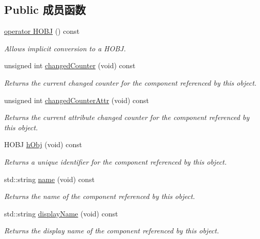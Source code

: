 \subsection*{Public 成员函数}
\begin{DoxyCompactItemize}
\item 
\hypertarget{classmv_i_m_p_a_c_t_1_1acquire_1_1_component_access_ac32f2e24d0edecf7da8368324bdc493f}{\hyperlink{classmv_i_m_p_a_c_t_1_1acquire_1_1_component_access_ac32f2e24d0edecf7da8368324bdc493f}{operator H\+O\+B\+J} () const }\label{classmv_i_m_p_a_c_t_1_1acquire_1_1_component_access_ac32f2e24d0edecf7da8368324bdc493f}

\begin{DoxyCompactList}\small\item\em Allows implicit conversion to a H\+O\+B\+J. \end{DoxyCompactList}\item 
unsigned int \hyperlink{classmv_i_m_p_a_c_t_1_1acquire_1_1_component_access_a9f1ce26fe668a03990316e35882ef82d}{changed\+Counter} (void) const 
\begin{DoxyCompactList}\small\item\em Returns the current changed counter for the component referenced by this object. \end{DoxyCompactList}\item 
unsigned int \hyperlink{classmv_i_m_p_a_c_t_1_1acquire_1_1_component_access_a85e01578b604a92613cdd692947ba3f1}{changed\+Counter\+Attr} (void) const 
\begin{DoxyCompactList}\small\item\em Returns the current attribute changed counter for the component referenced by this object. \end{DoxyCompactList}\item 
H\+O\+B\+J \hyperlink{classmv_i_m_p_a_c_t_1_1acquire_1_1_component_access_a071d08bf770f55552998b86580e979de}{h\+Obj} (void) const 
\begin{DoxyCompactList}\small\item\em Returns a unique identifier for the component referenced by this object. \end{DoxyCompactList}\item 
std\+::string \hyperlink{classmv_i_m_p_a_c_t_1_1acquire_1_1_component_access_aee8b40bfc45b5752e03570afaadce217}{name} (void) const 
\begin{DoxyCompactList}\small\item\em Returns the name of the component referenced by this object. \end{DoxyCompactList}\item 
std\+::string \hyperlink{classmv_i_m_p_a_c_t_1_1acquire_1_1_component_access_aaf61053aa53dc96896760cd402ab1541}{display\+Name} (void) const 
\begin{DoxyCompactList}\small\item\em Returns the display name of the component referenced by this object. \end{DoxyCompactList}\end{DoxyCompactItemize}
